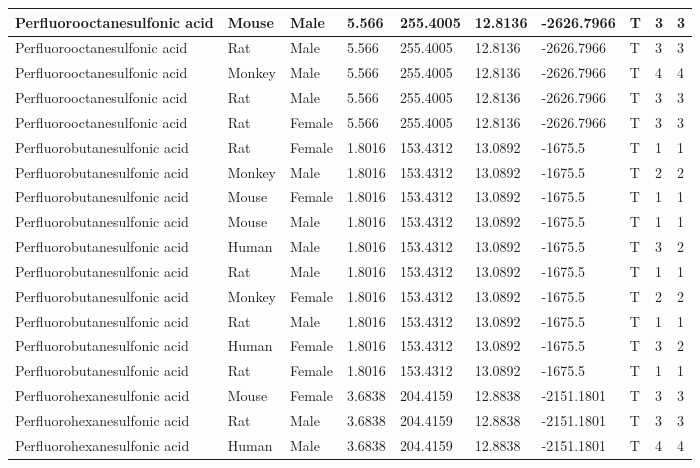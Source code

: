 \begin{table}[H]
{\begin{tabular}{|l|l|l|l|l|l|l|l|l|l|}
Perfluorooctanesulfonic   acid & Mouse & Male & 5.566 & 255.4005 & 12.8136 & -2626.7966 & T & 3 & 3 \\ \hline
Perfluorooctanesulfonic   acid & Rat & Male & 5.566 & 255.4005 & 12.8136 & -2626.7966 & T & 3 & 3 \\ \hline
Perfluorooctanesulfonic   acid & Monkey & Male & 5.566 & 255.4005 & 12.8136 & -2626.7966 & T & 4 & 4 \\ \hline
Perfluorooctanesulfonic   acid & Rat & Male & 5.566 & 255.4005 & 12.8136 & -2626.7966 & T & 3 & 3 \\ \hline
Perfluorooctanesulfonic   acid & Rat & Female & 5.566 & 255.4005 & 12.8136 & -2626.7966 & T & 3 & 3 \\ \hline
Perfluorobutanesulfonic   acid & Rat & Female & 1.8016 & 153.4312 & 13.0892 & -1675.5 & T & 1 & 1 \\ \hline
Perfluorobutanesulfonic   acid & Monkey & Male & 1.8016 & 153.4312 & 13.0892 & -1675.5 & T & 2 & 2 \\ \hline
Perfluorobutanesulfonic   acid & Mouse & Female & 1.8016 & 153.4312 & 13.0892 & -1675.5 & T & 1 & 1 \\ \hline
Perfluorobutanesulfonic   acid & Mouse & Male & 1.8016 & 153.4312 & 13.0892 & -1675.5 & T & 1 & 1 \\ \hline
\rowcolor[HTML]{DAE9F8} 
Perfluorobutanesulfonic   acid & Human & Male & 1.8016 & 153.4312 & 13.0892 & -1675.5 & T & 3 & 2 \\ \hline
Perfluorobutanesulfonic   acid & Rat & Male & 1.8016 & 153.4312 & 13.0892 & -1675.5 & T & 1 & 1 \\ \hline
Perfluorobutanesulfonic   acid & Monkey & Female & 1.8016 & 153.4312 & 13.0892 & -1675.5 & T & 2 & 2 \\ \hline
Perfluorobutanesulfonic   acid & Rat & Male & 1.8016 & 153.4312 & 13.0892 & -1675.5 & T & 1 & 1 \\ \hline
\rowcolor[HTML]{DAE9F8} 
Perfluorobutanesulfonic   acid & Human & Female & 1.8016 & 153.4312 & 13.0892 & -1675.5 & T & 3 & 2 \\ \hline
Perfluorobutanesulfonic   acid & Rat & Female & 1.8016 & 153.4312 & 13.0892 & -1675.5 & T & 1 & 1 \\ \hline
Perfluorohexanesulfonic   acid & Mouse & Female & 3.6838 & 204.4159 & 12.8838 & -2151.1801 & T & 3 & 3 \\ \hline
Perfluorohexanesulfonic   acid & Rat & Male & 3.6838 & 204.4159 & 12.8838 & -2151.1801 & T & 3 & 3 \\ \hline
Perfluorohexanesulfonic   acid & Human & Male & 3.6838 & 204.4159 & 12.8838 & -2151.1801 & T & 4 & 4 \\ \hline

\end{tabular}}
\end{table}
